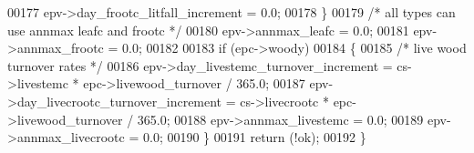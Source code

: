 \begin{DoxyCode}
00177         epv->day\_frootc\_litfall\_increment = 0.0;
00178     \}
00179     \textcolor{comment}{/* all types can use annmax leafc and frootc */}
00180     epv->annmax\_leafc = 0.0;
00181     epv->annmax\_frootc = 0.0;
00182     
00183     \textcolor{keywordflow}{if} (epc->woody)
00184     \{
00185         \textcolor{comment}{/* live wood turnover rates */}
00186         epv->day\_livestemc\_turnover\_increment = cs->livestemc * epc->livewood\_turnover / 365.0;
00187         epv->day\_livecrootc\_turnover\_increment = cs->livecrootc * epc->livewood\_turnover / 365.0;
00188         epv->annmax\_livestemc = 0.0;
00189         epv->annmax\_livecrootc = 0.0;
00190     \}
00191     \textcolor{keywordflow}{return} (!ok);
00192 \}
\end{DoxyCode}
